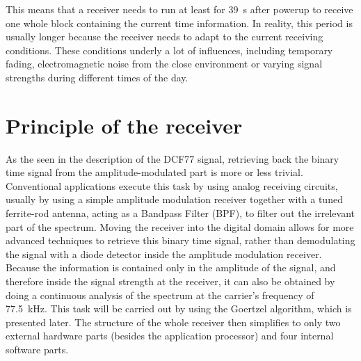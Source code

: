 \documentclass[conference]{IEEEtran}
\begin{document}
\FloatBarrier\noindent
This means that a receiver needs to run at least for \SI{39}{\second} after powerup to receive one whole block containing the current time information.
In reality, this period is usually longer because the receiver needs to adapt to the current receiving conditions. 
These conditions underly a lot of influences, including temporary fading, electromagnetic noise from the close environment or varying signal strengths
during different times of the day.

\section{Principle of the receiver}
As the seen in the description of the DCF77 signal, retrieving back the binary time signal from the amplitude-modulated part is more or less trivial.
Conventional applications execute this task by using analog receiving circuits, usually by using a simple amplitude modulation receiver together with a
tuned ferrite-rod antenna, acting as a Bandpass Filter (BPF), to filter out the irrelevant part of the spectrum. 
Moving the receiver into the digital domain allows for more advanced techniques to retrieve this binary time signal, rather than demodulating the signal with a
diode detector inside the amplitude modulation receiver.
Because the information is contained only in the amplitude of the signal, and therefore inside the signal strength at the receiver, it can also be obtained by doing a
continuous analysis of the spectrum at the carrier's frequency of \SI{77.5}{\kilo\hertz}.
This task will be carried out by using the Goertzel algorithm, which is presented later.
The structure of the whole receiver then simplifies to only two external hardware parts
(besides the application processor) and four internal software parts.
\end{document}
